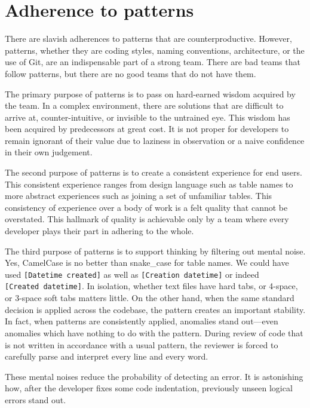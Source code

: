 \documentclass[10pt,openany,10pt]{book}
\begin{document}
\section{Adherence to patterns}\label{adherence-to-patterns}

There are slavish adherences to patterns that are counterproductive.
However, patterns, whether they are coding styles, naming conventions,
architecture, or the use of Git, are an indispensable part of a strong
team. There are bad teams that follow patterns, but there are no good
teams that do not have them.

The primary purpose of patterns is to pass on hard-earned wisdom
acquired by the team. In a complex environment, there are solutions that
are difficult to arrive at, counter-intuitive, or invisible to the
untrained eye. This wisdom has been acquired by predecessors at great
cost. It is not proper for developers to remain ignorant of their value
due to laziness in observation or a naive confidence in their own
judgement.

The second purpose of patterns is to create a consistent experience for
end users. This consistent experience ranges from design language such
as table names to more abstract experiences such as joining a set of
unfamiliar tables. This consistency of experience over a body of work is
a felt quality that cannot be overstated. This hallmark of quality is
achievable only by a team where every developer plays their part in
adhering to the whole.

The third purpose of patterns is to support thinking by filtering out
mental noise. Yes, CamelCase is no better than snake\_case for table
names. We could have used \texttt{{[}Datetime\ created{]}} as well as
\texttt{{[}Creation\ datetime{]}} or indeed
\texttt{{[}Created\ datetime{]}}. In isolation, whether text files have
hard tabs, or 4-space, or 3-space soft tabs matters little. On the other
hand, when the same standard decision is applied across the codebase,
the pattern creates an important stability. In fact, when patterns are
consistently applied, anomalies stand out---even anomalies which have
nothing to do with the pattern. During review of code that is not
written in accordance with a usual pattern, the reviewer is forced to
carefully parse and interpret every line and every word.

These mental noises reduce the probability of detecting an error. It is
astonishing how, after the developer fixes some code indentation,
previously unseen logical errors stand out.
\end{document}
